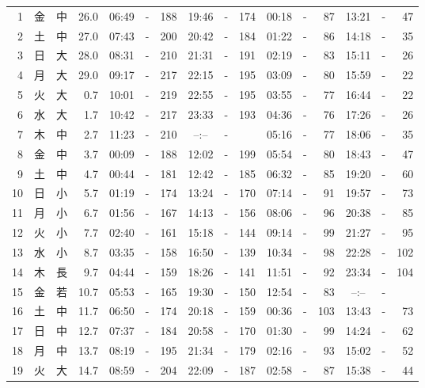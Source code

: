 \documentclass[12pt.a4j]{jsarticle}
\begin{document}
\begin{center}
\begin{table}[ht]
\begin{tabular}{|rc|cr|ccrccr|ccrccr|}
 \hline
 1 & 金 & 中 & 26.0 &  06:49 &-& 188  &  19:46 &-& 174  &   00:18 &-&  87  &   13:21 &-&  47  \\
 2 & 土 & 中 & 27.0 &  07:43 &-& 200  &  20:42 &-& 184  &   01:22 &-&  86  &   14:18 &-&  35  \\
 3 & 日 & 大 & 28.0 &  08:31 &-& 210  &  21:31 &-& 191  &   02:19 &-&  83  &   15:11 &-&  26  \\
 4 & 月 & 大 & 29.0 &  09:17 &-& 217  &  22:15 &-& 195  &   03:09 &-&  80  &   15:59 &-&  22  \\
 5 & 火 & 大 &  0.7 &  10:01 &-& 219  &  22:55 &-& 195  &   03:55 &-&  77  &   16:44 &-&  22  \\
 6 & 水 & 大 &  1.7 &  10:42 &-& 217  &  23:33 &-& 193  &   04:36 &-&  76  &   17:26 &-&  26  \\
 7 & 木 & 中 &  2.7 &  11:23 &-& 210  &  --:-- &-&     &   05:16 &-&  77  &   18:06 &-&  35  \\
 8 & 金 & 中 &  3.7 &  00:09 &-& 188  &  12:02 &-& 199  &   05:54 &-&  80  &   18:43 &-&  47  \\
 9 & 土 & 中 &  4.7 &  00:44 &-& 181  &  12:42 &-& 185  &   06:32 &-&  85  &   19:20 &-&  60  \\
10 & 日 & 小 &  5.7 &  01:19 &-& 174  &  13:24 &-& 170  &   07:14 &-&  91  &   19:57 &-&  73  \\
11 & 月 & 小 &  6.7 &  01:56 &-& 167  &  14:13 &-& 156  &   08:06 &-&  96  &   20:38 &-&  85  \\
12 & 火 & 小 &  7.7 &  02:40 &-& 161  &  15:18 &-& 144  &   09:14 &-&  99  &   21:27 &-&  95  \\
13 & 水 & 小 &  8.7 &  03:35 &-& 158  &  16:50 &-& 139  &   10:34 &-&  98  &   22:28 &-& 102  \\
14 & 木 & 長 &  9.7 &  04:44 &-& 159  &  18:26 &-& 141  &   11:51 &-&  92  &   23:34 &-& 104  \\
15 & 金 & 若 & 10.7 &  05:53 &-& 165  &  19:30 &-& 150  &   12:54 &-&  83  &   --:-- &-&     \\
16 & 土 & 中 & 11.7 &  06:50 &-& 174  &  20:18 &-& 159  &   00:36 &-& 103  &   13:43 &-&  73  \\
17 & 日 & 中 & 12.7 &  07:37 &-& 184  &  20:58 &-& 170  &   01:30 &-&  99  &   14:24 &-&  62  \\
18 & 月 & 中 & 13.7 &  08:19 &-& 195  &  21:34 &-& 179  &   02:16 &-&  93  &   15:02 &-&  52  \\
19 & 火 & 大 & 14.7 &  08:59 &-& 204  &  22:09 &-& 187  &   02:58 &-&  87  &   15:38 &-&  44  \\

\end{tabular}
\end{table}
\end{center}
\end{document}
